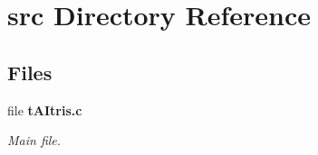 \section{src Directory Reference}
\label{dir_68267d1309a1af8e8297ef4c3efbcdba}
\subsection*{Files}
\begin{DoxyCompactItemize}
\item 
file \textbf{ t\+A\+Itris.\+c}
\begin{DoxyCompactList}\small\item\em Main file. \end{DoxyCompactList}\end{DoxyCompactItemize}
